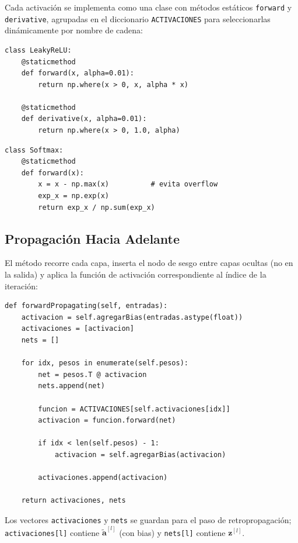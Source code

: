 Cada activación se implementa como una clase con métodos estáticos \texttt{forward} y
\texttt{derivative}, agrupadas en el diccionario \texttt{ACTIVACIONES} para seleccionarlas
dinámicamente por nombre de cadena:

\begin{lstlisting}[style=python, caption={Leaky ReLU (nueva respecto a versión original)}]
class LeakyReLU:
    @staticmethod
    def forward(x, alpha=0.01):
        return np.where(x > 0, x, alpha * x)

    @staticmethod
    def derivative(x, alpha=0.01):
        return np.where(x > 0, 1.0, alpha)
\end{lstlisting}

\begin{lstlisting}[style=python, caption={Softmax con estabilización numérica}]
class Softmax:
    @staticmethod
    def forward(x):
        x = x - np.max(x)          # evita overflow
        exp_x = np.exp(x)
        return exp_x / np.sum(exp_x)
\end{lstlisting}

\subsection{Propagación Hacia Adelante}

El método recorre cada capa, inserta el nodo de sesgo entre capas ocultas (no en la salida)
y aplica la función de activación correspondiente al índice de la iteración:

\begin{lstlisting}[style=python, caption={forwardPropagating}]
def forwardPropagating(self, entradas):
    activacion = self.agregarBias(entradas.astype(float))
    activaciones = [activacion]
    nets = []

    for idx, pesos in enumerate(self.pesos):
        net = pesos.T @ activacion
        nets.append(net)

        funcion = ACTIVACIONES[self.activaciones[idx]]
        activacion = funcion.forward(net)

        if idx < len(self.pesos) - 1:
            activacion = self.agregarBias(activacion)

        activaciones.append(activacion)

    return activaciones, nets
\end{lstlisting}

Los vectores \texttt{activaciones} y \texttt{nets} se guardan para el paso de
retropropagación; \texttt{activaciones[l]} contiene $\tilde{\mathbf{a}}^{[l]}$ (con bias)
y \texttt{nets[l]} contiene $\mathbf{z}^{[l]}$.


